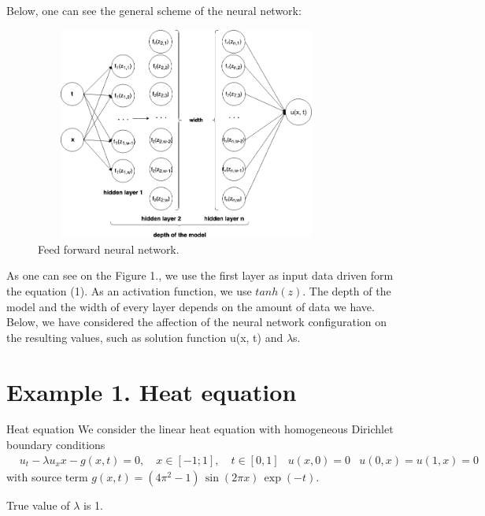 \documentclass{beamer}
\def\\{}%
\begin{document}
\begin{frame}

Below, one can see the general scheme of the neural network:
\begin{figure}
\centering
\includegraphics[width = 10cm , height = 7cm]{images/FFNN.png}
\\
\caption{Feed forward neural network.}
\end{figure}
\end{frame}

\begin{frame}

As one can see on the Figure 1., we use the first layer as input data driven
form the equation (1). As an activation function, we use $tanh(z)$. The depth of the model and the width of every layer depends on the amount of data we have. Below, we have considered the affection of the neural network configuration on the resulting values, such as solution function u(x, t) and $\lambda$s.

\end{frame}




\section{Example 1. Heat equation}

\begin{frame}{Heat equation}
    We consider the linear heat equation with homogeneous Dirichlet boundary
    conditions
\begin{align*}
    &u_t - \lambda u_xx - g(x, t) = 0, \quad x\in[-1; 1], \quad t\in[0, 1] \\
    &u(x, 0) = 0 \\
    &u(0, x) = u(1, x) = 0
\end{align*}
with source term $g(x, t) = (4\pi^2 -1) \, \sin(2\pi x) \, \exp(-t)$.

True value of $\lambda$ is 1.
\end{frame}
\end{document}
